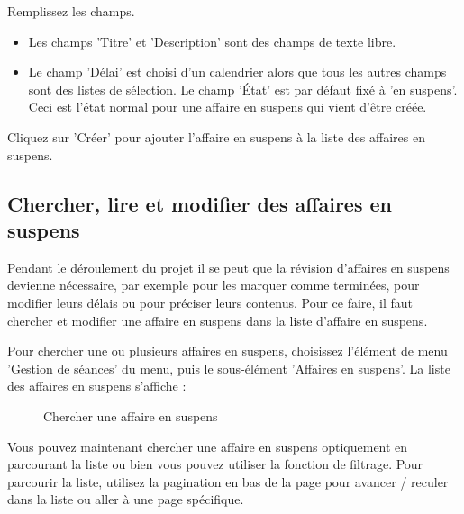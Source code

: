 Remplissez les champs.

\begin{itemize}
\item
Les champs 'Titre'  et 'Description'  sont des champs de texte libre.
\item
Le champ 'Délai'  est choisi d'un calendrier alors que tous les autres champs  sont des listes de sélection. Le champ 'État' est par défaut fixé à 'en suspens'. Ceci est l'état normal pour une affaire en suspens qui vient d'être créée.
\end{itemize}
Cliquez sur 'Créer'  pour ajouter l'affaire en suspens à la liste des affaires en suspens.

\subsection{Chercher, lire et modifier des affaires en suspens}
Pendant le déroulement du projet il se peut que la révision d'affaires en suspens devienne nécessaire, par exemple pour les marquer comme terminées, pour modifier leurs délais ou pour préciser leurs contenus. Pour ce faire, il faut chercher et modifier une affaire en suspens dans la liste d'affaire en suspens.

\vspace{\baselineskip}

Pour chercher une ou plusieurs affaires en suspens, choisissez l'élément de menu 'Gestion de séances' du menu, puis le sous-élément 'Affaires en suspens'. La liste des affaires en suspens s'affiche :

\begin{figure}[H]
\caption{Chercher une affaire en suspens}
\end{figure}

Vous pouvez maintenant chercher une affaire en suspens optiquement en parcourant la liste ou bien vous pouvez utiliser la fonction de filtrage. Pour parcourir la liste, utilisez la pagination en bas de la page pour avancer / reculer dans la liste ou aller à une page spécifique.

